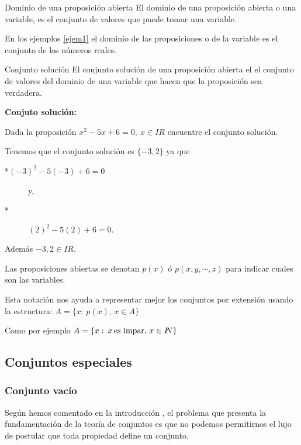 \begin{defi}{Dominio de una proposición abierta}{} El dominio de
una proposición abierta o una variable, es el conjunto de valores
que puede tomar una variable.\end{defi}

En los ejemplos \ref{ejem1} el dominio de las proposiciones o de
la variable es el conjunto de los números reales.

\begin{defi}{Conjunto solución}{} El conjunto solución de una proposición
abierta el el conjunto de valores del dominio de una variable que
hacen que la proposición sea verdadera.\end{defi}

\begin{ejemplo}{\bf Conjuto solución:} 

Dada la proposición $x^{2}-5x+6=0,\:x\in I\!\!R$ encuentre el conjunto
solución. \end{ejemplo}

\solu Tenemos que el conjunto solución es $\{-3,2\}$ ya que
\begin{description}
\item [{{*}$\left(-3\right)^{2}-5\left(-3\right)+6=0$}] y,
\item [{{*}}] $\left(2\right)^{2}-5\left(2\right)+6=0.$
\end{description}
Además $-3,2\in I\!\!R.$

\notacion Las proposiciones abiertas se denotan $p\left(x\right)$
ó $p(x,y,\cdots,z)$ para indicar cuales son las variables.

Esta notación nos ayuda a representar mejor los conjuntos por extensión
usando la estructura: $A=\{x:\,p(x),\,x\in A\}$

Como por ejemplo $A=\{x:\:x\,\mbox{es impar, \ensuremath{x\in I\!\!N}}\}$

\subsection{Conjuntos especiales}

\subsubsection{Conjunto vacío}

Según hemos comentado en la introducción , el problema que presenta
la fundamentación de la teoría de conjuntos es que no podemos permitirnos
el lujo de postular que toda propiedad define un conjunto. 

